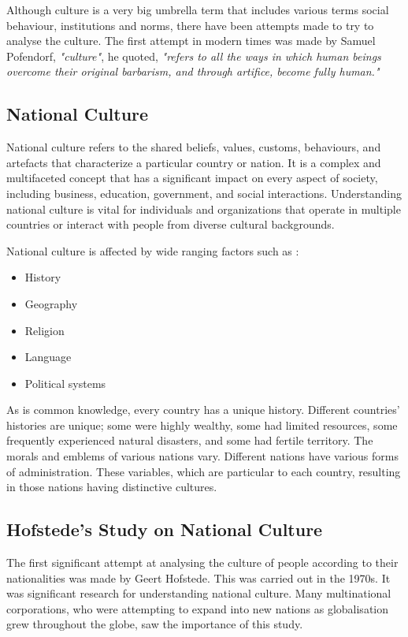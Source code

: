 \documentclass{article}
\begin{document}
Although culture is a very big umbrella term that includes various terms social behaviour, institutions and norms, there have been attempts made to try to analyse the culture. The first attempt in modern times was made by Samuel Pofendorf, \textit{"culture"}, he quoted, \textit{"refers to all the ways in which human beings overcome their original barbarism, and through artifice, become fully human."}

\subsection{National Culture}

National culture refers to the shared beliefs, values, customs, behaviours, and artefacts that characterize a particular country or nation. It is a complex and multifaceted concept that has a significant impact on every aspect of society, including business, education, government, and social interactions. Understanding national culture is vital for individuals and organizations that operate in multiple countries or interact with people from diverse cultural backgrounds.

National culture is affected by wide ranging factors such as :
\begin{itemize}
    \item History
    \item Geography
    \item Religion
    \item Language
    \item Political systems
\end{itemize}

As is common knowledge, every country has a unique history. Different countries' histories are unique; some were highly wealthy, some had limited resources, some frequently experienced natural disasters, and some had fertile territory. The morals and emblems of various nations vary. Different nations have various forms of administration. These variables, which are particular to each country, resulting in those nations having distinctive cultures.

\subsection{Hofstede's Study on National Culture}

The first significant attempt at analysing the culture of people according to their nationalities was made by Geert Hofstede. This was carried out in the 1970s. It was significant research for understanding national culture. Many multinational corporations, who were attempting to expand into new nations as globalisation grew throughout the globe, saw the importance of this study.
\end{document}
